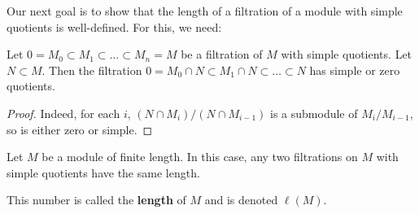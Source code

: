 Our next goal is to show that the length of a filtration of a module with
simple quotients is well-defined.
For this, we need:
\begin{lemma}  \label{simplefiltrationint}
Let $0 = M_0 \subset M_1 \subset \dots \subset M_n = M$ be  a filtration of
$M$ with simple quotients. Let $N \subset M$. Then the filtration
$0 = M_0 \cap N \subset M_1 \cap N \subset \dots \subset N$ has simple or zero
quotients. 
\end{lemma} 
\begin{proof} 
Indeed, for each $i$, $(N \cap M_i)/(N \cap M_{i-1})$ is a submodule of
$M_i / M_{i-1}$, so is either zero or simple.
\end{proof} 


\begin{theorem}\label{lengthexists} Let $M$ be a module of
finite length.
In this case, any two filtrations
on $M$ with simple quotients have the same length.
\end{theorem} 
\begin{definition} 
This number is called the \textbf{length} of $M$ and is denoted $\ell(M)$.
\end{definition} 
